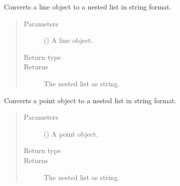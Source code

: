 \documentclass[letterpaper,10pt,english]{sphinxmanual}
\begin{document}

\begin{fulllineitems}
\label{\detokenize{index:secondodb.api.algebras.secondospatialalgebra.convert_line_to_list_exp_str}}
Converts a line object to a nested list in string format.
\begin{quote}\begin{description}
\item[{Parameters}] \leavevmode
{} ({\hyperref[\detokenize{index:secondodb.api.algebras.secondospatialalgebra.Line}]{}}) \textendash{} A line object.

\item[{Return type}] \leavevmode
{}

\item[{Returns}] \leavevmode
The nested list as string.

\end{description}\end{quote}

\end{fulllineitems}


\begin{fulllineitems}
\label{\detokenize{index:secondodb.api.algebras.secondospatialalgebra.convert_point_to_list_exp_str}}
Converts a point object to a nested list in string format.
\begin{quote}\begin{description}
\item[{Parameters}] \leavevmode
{} ({\hyperref[\detokenize{index:secondodb.api.algebras.secondospatialalgebra.Point}]{}}) \textendash{} A point object.

\item[{Return type}] \leavevmode
{}

\item[{Returns}] \leavevmode
The nested list as string.

\end{description}\end{quote}

\end{fulllineitems}
\end{document}
